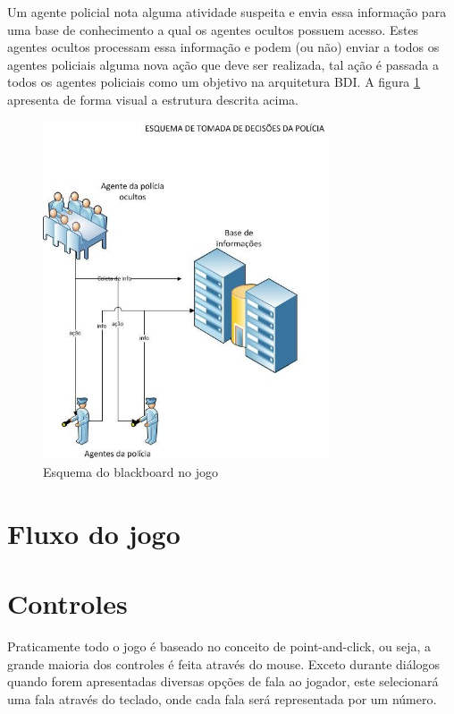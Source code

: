 Um agente policial nota alguma atividade suspeita e envia essa informação para uma base de conhecimento a qual os agentes ocultos possuem acesso. Estes agentes ocultos processam essa informação e podem (ou não) enviar a todos os agentes policiais alguma nova ação que deve ser realizada, tal ação é passada a todos os agentes policiais como um objetivo na arquitetura BDI.
A figura \ref{blackboard_policia} apresenta de forma visual a estrutura descrita acima.
\begin{figure}
\centering
\includegraphics [height=10cm]{figuras/blackboard_policia.jpg}
\caption{Esquema do blackboard no jogo}
\label{blackboard_policia}
\end{figure}

\section{Fluxo do jogo}

\section{Controles}
Praticamente todo o jogo é baseado no conceito de point-and-click, ou seja, a grande maioria dos controles é feita através do mouse. Exceto durante diálogos quando forem apresentadas diversas opções de fala ao jogador, este selecionará uma fala através do teclado, onde cada fala será representada por um número.

